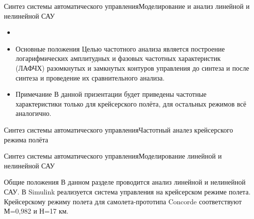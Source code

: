 \begin{frame}{Синтез системы автоматического управления}{Моделирование и анализ линейной и нелинейной САУ}
    \begin{itemize}
        \item <+-> []
        \item <+-> []
    \begin{block}{Основные положения}
        Целью частотного анализа является построение логарифмических амплитудных и фазовых частотных характеристик (ЛАФЧХ) 
        разомкнутых и замкнутых контуров управления до синтеза и после синтеза и проведение их сравнительного анализа.
    \end{block}
    \item <+-> []
    \begin{block}{Примечание}
        В данной призентации будет приведены частотные характеристики только для крейсерского полёта, 
        для остальных режимов всё аналогично.
    \end{block}
\end{itemize}
\end{frame}

\begin{frame}{Синтез системы автоматического управления}{Частотный аналез крейсерского режима полёта}
\end{frame}

\begin{frame}{Синтез системы автоматического управления}{Моделирование линейной и нелинейной САУ}
    \begin{block}{Общие положения}
        В данном разделе проводится анализ линейной и нелинейной САУ. В Simulink реализуется система управления на 
        крейсерском режиме полета. Крейсерскому режиму полета для самолета-прототипа Concorde соответствуют 
        М=0,982 и Н=17 км. 
    \end{block}
\end{frame}

